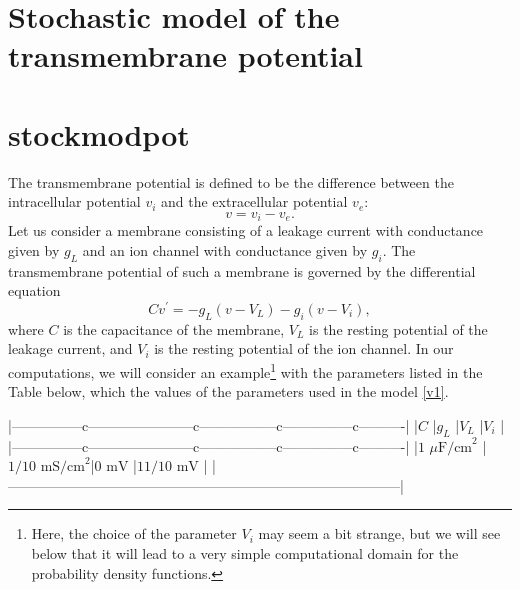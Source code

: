 \section[Stochastic model]{Stochastic model of the transmembrane potential}
\section{stockmodpot}
The transmembrane potential is defined to be the difference between the
intracellular potential $v_{i}$ and the extracellular potential $v_{e}$:
\begin{equation}
v=v_{i}-v_{e}. \label{v0}
\end{equation}
Let us consider a membrane consisting of a leakage current with conductance
given by $g_{L}$ and an ion channel with conductance given by $g_{i}.$ The
transmembrane potential of such a membrane is governed by the
differential equation
\begin{equation}
Cv^{\prime}=-g_{L}\left(  v-V_{L}\right)  -g_{i}(v-V_{i}), \label{v1}
\end{equation}
where $C$ is the capacitance of the membrane, $V_{L}$ is the resting potential
of the leakage current, and $V_{i}$ is the resting potential of the ion
channel. In our computations, we will consider an example\footnote{Here, the choice of the parameter $V_i$ may seem a bit strange, but we will see below that it will lead to a very simple computational domain for the probability density functions.} 
with the parameters listed in the Table below, which the values of the parameters used in the model \ref{v1}.


|---------------c-----------------------c-----------------c---------------c----------|
|$C$                      |$g_L$                   |$V_L$         |$V_{i}$           |
|---------------c-----------------------c-----------------c---------------c----------|
|$1$ $\mu\text{F/cm}^{2}$ |$1/10 \text{ mS/cm}^{2}$|$0\text{ mV}$ |$11/10\text{ mV}$ |
|------------------------------------------------------------------------------------|
 
